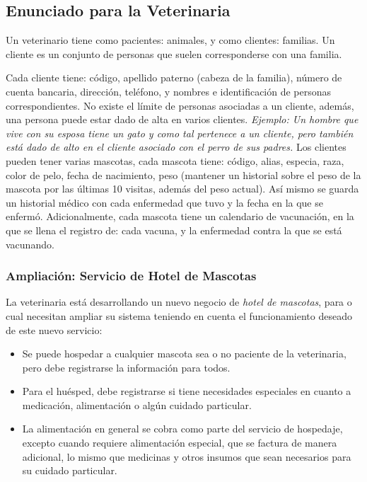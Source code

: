 \documentclass[
  12pt,
  hidelinks,
  a4paper,
  headings=standardclasses,
  headings=big,
  spanish
]{scrartcl}
\begin{document}
\subsection{Enunciado para la Veterinaria}

Un veterinario tiene como pacientes: animales, y como clientes: familias.
Un cliente es un conjunto de personas que suelen corresponderse con una familia.

Cada cliente tiene: código, apellido paterno (cabeza de la familia), número de cuenta bancaria, dirección, teléfono, y nombres e identificación de personas correspondientes.
No existe el límite de personas asociadas a un cliente, además, una persona puede estar dado de alta en varios clientes.
\emph{Ejemplo: Un hombre que vive con su esposa tiene un gato y como tal pertenece a un cliente, pero también está dado de alto en el cliente asociado con el perro de sus padres.}
Los clientes pueden tener varias mascotas, cada mascota tiene: código, alias, especia, raza, color de pelo, fecha de nacimiento, peso (mantener un historial sobre el peso de la mascota por las últimas 10 visitas, además del peso actual).
Así mismo se guarda un historial médico con cada enfermedad que tuvo y la fecha en la que se enfermó.
Adicionalmente, cada mascota tiene un calendario de vacunación, en la que se llena el registro de: cada vacuna, y la enfermedad contra la que se está vacunando.

\subsubsection{Ampliación: Servicio de Hotel de Mascotas}

La veterinaria está desarrollando un nuevo negocio de \emph{hotel de mascotas}, para o cual necesitan ampliar su sistema teniendo en cuenta el funcionamiento deseado de este nuevo servicio:

\begin{itemize}
  \item Se puede hospedar a cualquier mascota sea o no paciente de la veterinaria, pero debe registrarse la información para todos.
  \item Para el huésped, debe registrarse si tiene necesidades especiales en cuanto a medicación, alimentación o algún cuidado particular.
  \item La alimentación en general se cobra como parte del servicio de hospedaje, excepto cuando requiere alimentación especial, que se factura de manera adicional, lo mismo que medicinas y otros insumos que sean necesarios para su cuidado particular.
\end{itemize}
\end{document}
